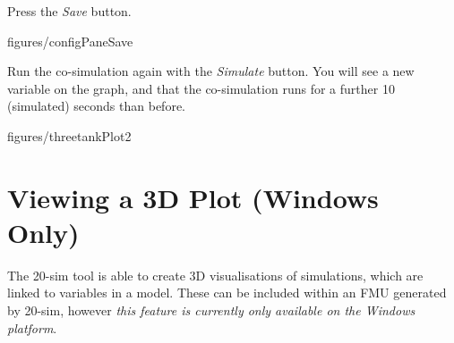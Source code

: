 \documentclass[11pt,a4paper]{../tutorial}
\begin{document}
\begin{instructions}
\item Press the \emph{Save} button.

    \begin{annotation}[width=0.84\linewidth,trim=0 0 0 370,clip]{figures/configPaneSave}
    \end{annotation}

\item Run the co-simulation again with the \emph{Simulate} button. You will see a new variable on the graph, and that the co-simulation runs for a further 10 (simulated) seconds than before.

    \begin{annotation}[width=0.84\linewidth]{figures/threetankPlot2}
    \end{annotation}

\end{instructions}

\section{Viewing a 3D Plot (Windows Only)}

The 20-sim tool is able to create 3D visualisations of simulations, which are linked to variables in a model. These can be included within an FMU generated by 20-sim, however \emph{this feature is currently only available on the Windows platform}.
\end{document}
